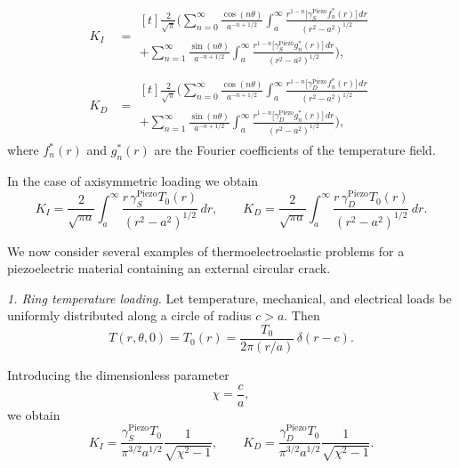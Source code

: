 \begin{equation}
	\begin{aligned}
	K_I
	&=
\begin{multlined}[t]
	\frac{2}{\sqrt{\pi}}
	\bigg(
	\sum_{n=0}^{\infty}
	\frac{\cos(n\theta)}{a^{-n+1/2}}
	\int_{a}^{\infty}
	\frac{r^{1-n}\bigl[\gamma_S^{\text{Piezo}}f_n^{*}(r)\bigr]\,dr}
	{(r^{2}-a^{2})^{1/2}}
\\
	+\sum_{n=1}^{\infty}
	\frac{\sin(n\theta)}{a^{-n+1/2}}
	\int_{a}^{\infty}
	\frac{r^{1-n}\bigl[\gamma_S^{\text{Piezo}}g_n^{*}(r)\bigr]\,dr}
	{(r^{2}-a^{2})^{1/2}}
	\bigg),
\end{multlined}
\\
	K_D
	&=
	\begin{multlined}[t]
	\frac{2}{\sqrt{\pi}}
	\bigg(
	\sum_{n=0}^{\infty}
	\frac{\cos(n\theta)}{a^{-n+1/2}}
	\int_{a}^{\infty}
	\frac{r^{1-n}\bigl[\gamma_D^{\text{Piezo}}f_n^{*}(r)\bigr]\,dr}
	{(r^{2}-a^{2})^{1/2}}
	\\
	+\sum_{n=1}^{\infty}
	\frac{\sin(n\theta)}{a^{-n+1/2}}
	\int_{a}^{\infty}
	\frac{r^{1-n}\bigl[\gamma_D^{\text{Piezo}}g_n^{*}(r)\bigr]\,dr}
	{(r^{2}-a^{2})^{1/2}}
	\bigg),
	\end{multlined}
	\end{aligned}
	\label{KirilyukEq35}
\end{equation}
where $f_n^{*}(r)$ and $g_n^{*}(r)$ are the Fourier coefficients of the temperature field.

In the case of axisymmetric loading we obtain
\begin{equation}
	K_I
	=
	\frac{2}{\sqrt{\pi a}}
	\int_{a}^{\infty}
	\frac{r\,\gamma_S^{\text{Piezo}}T_0(r)}{(r^{2}-a^{2})^{1/2}}\,dr,
	\qquad
	K_D
	=
	\frac{2}{\sqrt{\pi a}}
	\int_{a}^{\infty}
	\frac{r\,\gamma_D^{\text{Piezo}}T_0(r)}{(r^{2}-a^{2})^{1/2}}\,dr .
	\label{KirilyukEq36}
\end{equation}

We now consider several examples of thermoelectroelastic problems for a piezoelectric material containing an external circular crack.

\medskip
\emph{1. Ring temperature loading.} Let temperature, mechanical, and electrical loads be uniformly distributed along a circle of radius $c>a$. Then
\[
T(r,\theta,0)
=
T_0(r)
=
\frac{T_0}{2\pi(r/a)}\,\delta(r-c).
\]

Introducing the dimensionless parameter
\[
\chi=\frac{c}{a},
\]
we obtain
\begin{equation}
	K_I
	=
	\frac{\gamma_S^{\text{Piezo}}T_0}{\pi^{3/2}a^{1/2}}
	\frac{1}{\sqrt{\chi^{2}-1}},
	\qquad
	K_D
	=
	\frac{\gamma_D^{\text{Piezo}}T_0}{\pi^{3/2}a^{1/2}}
	\frac{1}{\sqrt{\chi^{2}-1}} .
	\label{KirilyukEq37}
\end{equation}

